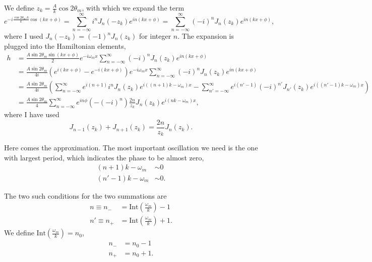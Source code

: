 We define $z_k = \frac{A}{k} \cos 2\theta_m$, with which we expand the term
\begin{equation}
   e^{-i\frac{\cos 2\theta_m A}{k} \cos (kx +\phi)} = \sum_{n=-\infty}^\infty i^n J_n (-z_k) e^{in (kx +\phi)} =  \sum_{n=-\infty}^\infty (-i)^n J_n (z_k) e^{in (kx +\phi)},
\end{equation}
where I used $J_n(-z_k) = (-1)^n J_n(z_k)$ for integer $n$.
The expansion is plugged into the Hamiltonian elements,
\begin{align}
   h &= \frac{A \sin 2\theta_m \sin (kx + \phi)}{2} e^{-i\omega_m x } \sum_{n = - \infty}^\infty (-i)^n J_n(z_k) e^{i n ( kx + \phi)} \\
   & = \frac{A\sin 2\theta_m}{4i} \left( e^{i(kx + \phi)} - e^{-i(kx+\phi)} \right) e^{-i\omega_m x } \sum_{n = - \infty}^\infty (-i)^n J_n(z_k) e^{i n ( kx + \phi)} \\
   & = \frac{A\sin 2\theta_m}{4i} \left( \sum_{n=-\infty}^\infty e^{i(n+1)} i^n J_n (z_k) e^{i((n+1) k - \omega_m)x}  - \sum_{n'=-\infty}^\infty e^{i(n'-1)} (-i)^{n'}J_{n'}(z_k) e^{i( (n'-1)k - \omega_m)x}  \right)\\
   & = \frac{A\sin 2\theta_m}{4} \sum_{n=-\infty}^{\infty} e^{in\phi} \left( - (-i)^n \right) \frac{2n}{z_k} J_n (z_k) e^{i(nk-\omega_m)x},
\end{align}
where I have used
\begin{equation}
   J_{n-1}(z_k) + J_{n+1}(z_k) = \frac{2n}{z_k} J_n(z_k).
\end{equation}

Here comes the approximation. The most important oscillation we need is the one with largest period, which indicates the phase to be almost zero,
\begin{align}
   (n+1) k -\omega_m &\sim 0 \\
   (n'-1) k -\omega_m &\sim 0.
   \label{chap:matter-sec:deep-jacobi-subsec:single-matter-freq-eqn:single-frequency-rwa-requirement}
\end{align}

The two such conditions for the two summations are
\begin{align}
   n \equiv n_- &= \mathrm{Int}\left( \frac{\omega_m}{k} \right) - 1 \\
   n' \equiv n_+ &= \mathrm{Int}\left( \frac{\omega_m}{k} \right) + 1 .
\end{align}
We define $\mathrm{Int}\left( \frac{\omega_m}{k} \right) = n_0$,
\begin{align}
   n_- &= n_0 - 1 \\
   n_+ &= n_0 + 1 .
\end{align}

